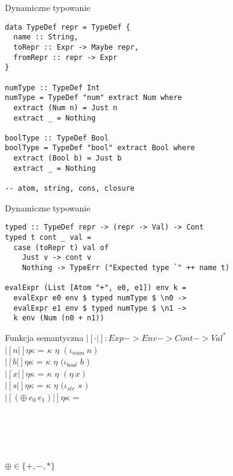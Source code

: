 \documentclass[12pt,serif]{beamer}
\begin{document}
\begin{frame}[fragile]{Dynamiczne typowanie}
\footnotesize \begin{verbatim}
data TypeDef repr = TypeDef {
  name :: String,
  toRepr :: Expr -> Maybe repr,
  fromRepr :: repr -> Expr
}

numType :: TypeDef Int
numType = TypeDef "num" extract Num where
  extract (Num n) = Just n
  extract _ = Nothing

boolType :: TypeDef Bool
boolType = TypeDef "bool" extract Bool where
  extract (Bool b) = Just b
  extract _ = Nothing
  
-- atom, string, cons, closure
\end{verbatim}
\end{frame}

\begin{frame}[fragile]{Dynamiczne typowanie}
\footnotesize \begin{verbatim}
typed :: TypeDef repr -> (repr -> Val) -> Cont
typed t cont _ val =
  case (toRepr t) val of
    Just v -> cont v
    Nothing -> TypeErr ("Expected type `" ++ name t)

evalExpr (List [Atom "+", e0, e1]) env k =
  evalExpr e0 env $ typed numType $ \n0 ->
  evalExpr e1 env $ typed numType $ \n1 ->
  k env (Num (n0 + n1))
\end{verbatim}
\end{frame}


\begin{frame}{Funkcja semantyczna}
$|[ \cdot |]: Exp -> Env -> Cont -> Val^{*}$ \newline
\\
$|[n|] \eta \kappa$ = $\kappa$ $\eta$ $(\iota_{num}~n)$ \\
$|[b|] \eta \kappa$ = $\kappa$ $\eta$ $(\iota_{bool}$ $b$ $)$ \\
$|[x|] \eta \kappa$ = $\kappa$ $\eta$ $(\eta~x)$ \\
$|[s|] \eta \kappa$ = $\kappa$ $\eta$ $(\iota_{str}$ $s$ $)$ \newline
\\
$|[(\oplus~e_0~e_1)|] \eta \kappa$ = \\
\hspace{1em}{$|[e_0|]$ $\eta$ ($\lambda \eta_0 n_0$ .} \\
\hspace{2em}{$|[e_1|]$ $\eta$ ($\lambda \eta_1 n_1$ .} \\
 \\
 \\
 \newline
\\
$\oplus \in \{+,-,*\}$
\end{frame}
\end{document}
